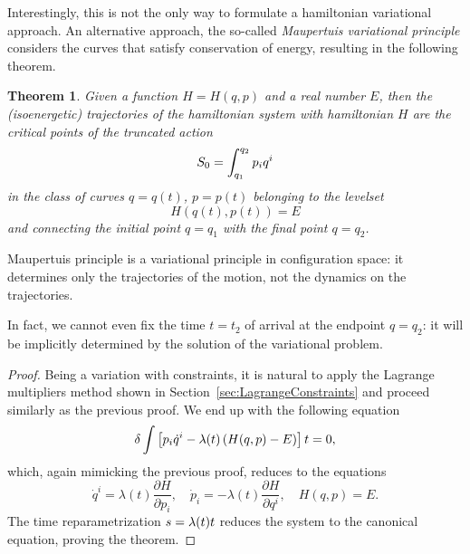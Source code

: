 \documentclass[english,fontsize=11pt,paper=a5,oneside]{scrbook}
\let\d\relax
\DeclareMathOperator{\d}{d}
\newtheorem{theorem}{Theorem}[chapter]
\theoremstyle{definition}
\newenvironment{remark}
  {\pushQED{\qed}\renewcommand{\qedsymbol}{$\lozenge$}\remarkx}
  {\popQED\endremarkx}
\begin{document}
Interestingly, this is not the only way to formulate a hamiltonian variational approach.
An alternative approach, the so-called \emph{Maupertuis variational principle} considers the curves that satisfy conservation of energy, resulting in the following theorem.

\begin{theorem}
    Given a function $H=H(q,p)$ and a real number $E$, then the (isoenergetic) \emph{trajectories} of the hamiltonian system with hamiltonian $H$ are the critical points of the truncated action
    \begin{equation}\label{eq:variationalMaupertuis}
        S_0 = \int_{q_1}^{q_2} p_i \d q^i
    \end{equation}
    in the class of curves $q=q(t)$, $p=p(t)$ belonging to the levelset
    \begin{equation}
        H(q(t),p(t)) = E
    \end{equation}
    and connecting the initial point $q=q_1$ with the final point $q=q_2$.
\end{theorem}

\begin{remark}
    Maupertuis principle is a variational principle in configuration space: it determines only the trajectories of the motion, not the dynamics on the trajectories.

    In fact, we cannot even fix the time $t=t_2$ of arrival at the endpoint $q=q_2$: it will be implicitly determined by the solution of the variational problem.
\end{remark}

\begin{proof}
    Being a variation with constraints, it is natural to apply the Lagrange multipliers method shown in Section~\ref{sec:LagrangeConstraints} and proceed similarly as the previous proof. We end up with the following equation
    \begin{equation}
        \delta \int \left[p_i \dot q^i - \lambda(t)\left(H(q,p) - E\right)\right]\d t = 0,
    \end{equation}
    which, again mimicking the previous proof, reduces to the equations
    \begin{equation}
        \dot q^i = \lambda(t) \frac{\partial H}{\partial p_i},
        \quad
        \dot p_i = -\lambda(t) \frac{\partial H}{\partial q^i},
        \quad H(q,p) = E.
    \end{equation}
    The time reparametrization $\d s = \lambda(t)\d t$ reduces the system to the canonical equation, proving the theorem.
\end{proof}
\end{document}

